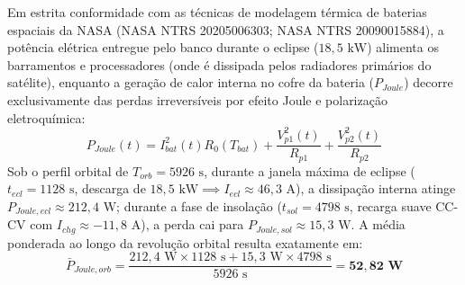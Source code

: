 Em estrita conformidade com as técnicas de modelagem térmica de baterias espaciais da NASA (NASA NTRS 20205006303; NASA NTRS 20090015884), a potência elétrica entregue pelo banco durante o eclipse ($18{,}5\text{ kW}$) alimenta os barramentos e processadores (onde é dissipada pelos radiadores primários do satélite), enquanto a geração de calor interna no cofre da bateria ($P_{Joule}$) decorre exclusivamente das perdas irreversíveis por efeito Joule e polarização eletroquímica:
\begin{equation}
    P_{Joule}(t) = I_{bat}^2(t) R_0(T_{bat}) + \frac{V_{p1}^2(t)}{R_{p1}} + \frac{V_{p2}^2(t)}{R_{p2}}
    \label{eq:pjoule_bateria}
\end{equation}
Sob o perfil orbital de $T_{orb} = 5926\text{ s}$, durante a janela máxima de eclipse ($t_{ecl} = 1128\text{ s}$, descarga de $18{,}5\text{ kW} \implies I_{ecl} \approx 46{,}3\text{ A}$), a dissipação interna atinge $P_{Joule,ecl} \approx 212{,}4\text{ W}$; durante a fase de insolação ($t_{sol} = 4798\text{ s}$, recarga suave CC-CV com $I_{chg} \approx -11{,}8\text{ A}$), a perda cai para $P_{Joule,sol} \approx 15{,}3\text{ W}$. A média ponderada ao longo da revolução orbital resulta exatamente em:
\begin{equation}
    \bar{P}_{Joule,orb} = \frac{212{,}4\text{ W} \times 1128\text{ s} + 15{,}3\text{ W} \times 4798\text{ s}}{5926\text{ s}} = \mathbf{52{,}82\text{ W}}
    \label{eq:pjoule_medio_orbital}
\end{equation}


